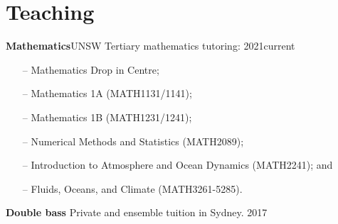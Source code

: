 
\section{Teaching}



\textbf{Mathematics}\hfill UNSW
\newline
Tertiary mathematics tutoring: \hfill 2021\textendash current
\begin{itemize}
    \item[--] Mathematics Drop in Centre;
    \item[--] Mathematics 1A (MATH1131/1141);
    \item[--] Mathematics 1B (MATH1231/1241);
    \item[--] Numerical Methods and Statistics (MATH2089);
    \item[--] Introduction to Atmosphere and Ocean Dynamics (MATH2241); and
    \item[--] Fluids, Oceans, and Climate (MATH3261-5285).
\end{itemize}

\textbf{Double bass}
\newline
Private and ensemble tuition in Sydney. \hfill 2017